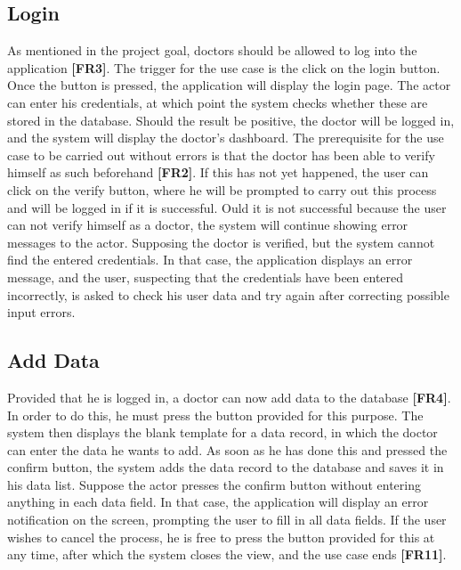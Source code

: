 \subsection{Login}
As mentioned in the project goal, doctors should be allowed to log into the application \textbf{[FR3]}. The trigger for the use case is the click on the login button. Once the button is pressed, the application will display the login page. The actor can enter his credentials, at which point the system checks whether these are stored in the database. Should the result be positive, the doctor will be logged in, and the system will display the doctor's dashboard. The prerequisite for the use case to be carried out without errors is that the doctor has been able to verify himself as such beforehand \textbf{[FR2]}. If this has not yet happened, the user can click on the verify button, where he will be prompted to carry out this process and will be logged in if it is successful. Ould it is not successful because the user can not verify himself as a doctor, the system will continue showing error messages to the actor. Supposing the doctor is verified, but the system cannot find the entered credentials. In that case, the application displays an error message, and the user, suspecting that the credentials have been entered incorrectly, is asked to check his user data and try again after correcting possible input errors.

\subsection{Add Data}
Provided that he is logged in, a doctor can now add data to the database \textbf{[FR4]}. In order to do this, he must press the button provided for this purpose. The system then displays the blank template for a data record, in which the doctor can enter the data he wants to add. As soon as he has done this and pressed the confirm button, the system adds the data record to the database and saves it in his data list. Suppose the actor presses the confirm button without entering anything in each data field. In that case, the application will display an error notification on the screen, prompting the user to fill in all data fields. If the user wishes to cancel the process, he is free to press the button provided for this at any time, after which the system closes the view, and the use case ends \textbf{[FR11]}. 

